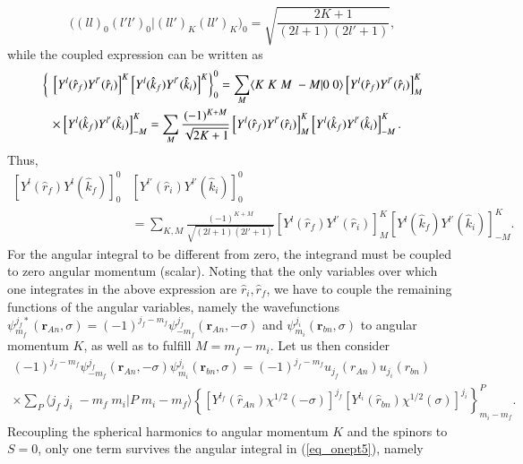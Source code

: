 \begin{equation}\label{eq_onept9}
\bigl((l l)_0(l' l')_0|(l l')_K(l l')_K\bigr)_0=\sqrt{\frac{2K+1}{(2l+1)(2l'+1)}},
\end{equation}
while the coupled expression can be written as
\begin{equation}\label{eq_onept10}
    \begin{split}
\left\{\vphantom{\left[ Y^{l} (\hat r_f) Y^{l'} (\hat r_i)\right]^K}\right.&\left.\left[ Y^{l} (\hat r_f) Y^{l'} (\hat r_i)\right]^K\left[ Y^{l} (\hat k_f) Y^{l'} (\hat k_i)\right]^K\right\}^0_0=\sum_M \langle K\;K\;M\;-M|0\;0\rangle
 \left[ Y^{l} (\hat r_f) Y^{l'} (\hat r_i)\right]^K_M\\
 &\times\left[ Y^{l} (\hat k_f) Y^{l'} (\hat k_i)\right]^K_{-M}=\sum_M\frac{(-1)^{K+M}}{\sqrt{2K+1}}\left[ Y^{l} (\hat r_f) Y^{l'} (\hat r_i)\right]^K_M
\left[ Y^{l} (\hat k_f) Y^{l'} (\hat k_i)\right]^K_{-M}.
    \end{split}
\end{equation}
Thus,
\begin{equation}\label{eq_onept11}
    \begin{split}
\left[ Y^{l} (\hat r_f) Y^{l} (\hat k_f)\right]^0_0&\left[ Y^{l'} (\hat r_i) Y^{l'} (\hat k_i)\right]^0_0\\
&=\sum_{K,M}\frac{(-1)^{K+M}}{\sqrt{(2l+1)(2l'+1)}}\left[ Y^{l} (\hat r_f) Y^{l'} (\hat r_i)\right]^K_M
\left[ Y^{l} (\hat k_f) Y^{l'} (\hat k_i)\right]^K_{-M}.
    \end{split}
\end{equation}
For the angular integral to be different from zero, the integrand must be coupled to zero angular momentum (scalar). Noting that the only  variables over which one integrates in the above expression  are $\hat r_i,\hat r_f$, we have to couple the remaining functions of the angular variables, namely the wavefunctions $\psi_{m_f}^{j_f*}(\mathbf{r}_{An},\sigma)=(-1)^{j_f-m_f}\psi_{-m_f}^{j_f}(\mathbf{r}_{An},-\sigma)$ and $\psi_{m_i}^{j_i}(\mathbf{r}_{bn},\sigma)$ to angular momentum $K$, as well as to fulfill $M=m_f-m_i$. Let us then consider
\begin{multline}\label{eq_onept35}
(-1)^{j_f-m_f}\psi_{-m_f}^{j_f}(\mathbf{r}_{An},-\sigma)\psi_{m_i}^{j_i}(\mathbf{r}_{bn},\sigma)=
(-1)^{j_f-m_f}u_{j_f}(r_{An})u_{j_i}(r_{bn})\\
\times \sum_P \langle j_f\;j_i\;-m_f\;m_i|P\;m_i-m_f\rangle \left\{\left[ Y^{l_f}(\hat r_{An}) \chi^{1/2}(-\sigma)\right]^{j_f}\left[ Y^{l_i}(\hat r_{bn}) \chi^{1/2}(\sigma)\right]^{j_i}\right\}^P_{m_i-m_f}.
\end{multline}
Recoupling the spherical harmonics to angular momentum $K$ and the spinors to $S=0$, only one term survives the angular integral in (\ref{eq_onept5}), namely

